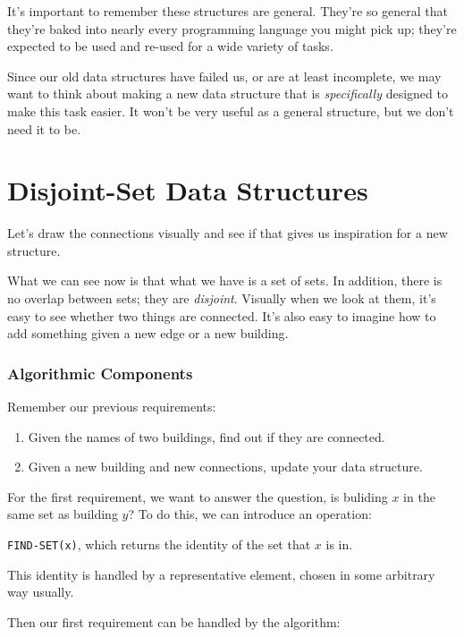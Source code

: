 \documentclass[]{article}
\begin{document}
    It's important to remember these structures are general. They're so general that they're baked into nearly every programming language you might pick up; they're expected to be used and re-used for a wide variety of tasks. 

    Since our old data structures have failed us, or are at least incomplete, we may want to think about making a new data structure that is \textit{specifically} designed to make this task easier. It won't be very useful as a general structure, but we don't need it to be. 
    
    \section*{Disjoint-Set Data Structures}

    Let's draw the connections visually and see if that gives us inspiration for a new structure. 

    What we can see now is that what we have is a set of sets. In addition, there is no overlap between sets; they are \textit{disjoint}. Visually when we look at them, it's easy to see whether two things are connected. It's also easy to imagine how to add something given a new edge or a new building. 

    \subsubsection*{Algorithmic Components}

    Remember our previous requirements: 
    
    \begin{enumerate}
        \item Given the names of two buildings, find out if they are connected.
        \item Given a new building and new connections, update your data structure.
    \end{enumerate}

    For the first requirement, we want to answer the question, is buliding $x$ in the same set as building $y$? To do this, we can introduce an operation:
    
    \texttt{FIND-SET(x)}, which returns the identity of the set that $x$ is in. 
    
    This identity is handled by a representative element, chosen in some arbitrary way usually. 

    Then our first requirement can be handled by the algorithm:
\end{document}
